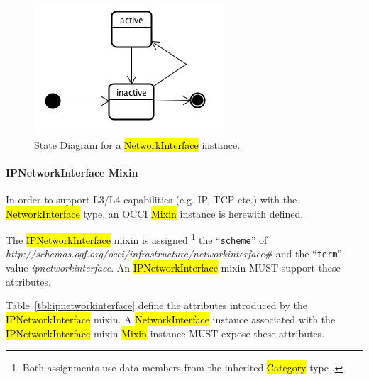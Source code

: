 \documentclass[10pt,a4paper]{article}
\begin{document}
\begin{figure}[!h]
	\centering
	\includegraphics[scale=0.4]{figs/infra-link-state.png}
	\caption{State Diagram for a \hl{NetworkInterface} instance.}
	\label{fig:networklink_state}
\end{figure}

\paragraph{IPNetworkInterface Mixin}
In order to support L3/L4 capabilities (e.g. IP, TCP etc.) with the
\hl{NetworkInterface} type, an OCCI \hl{Mixin} instance is herewith defined.

The \hl{IPNetworkInterface} mixin is assigned%
\footnote{Both assignments use data members from the inherited \hl{Category}
type \cite{occi:core}.}
the ``{\tt scheme}'' of
\textit{http://schemas.ogf.org/occi/infrastructure/networkinterface\#} and the ``{\tt term}'' value 
\textit{ipnetworkinterface}. 
An \hl{IPNetworkInterface} mixin MUST support these attributes.

Table~\ref{tbl:ipnetworkinterface} define the attributes introduced by the
\hl{IPNetworkInterface} mixin.  A \hl{NetworkInterface} instance associated with the
\hl{IPNetworkInterface} mixin \hl{Mixin} instance MUST expose these attributes.

\end{document}
